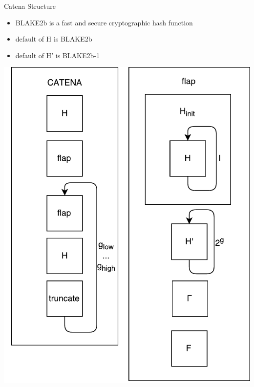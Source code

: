 \documentclass[11pt,aspectratio=169]{beamer}
\begin{document}
\begin{frame}{Catena Structure}  
  \begin{minipage}[H]{0.55\linewidth}
    \begin{itemize}
      \item BLAKE2b is a fast and secure cryptographic hash function
      \item default of H is BLAKE2b
      \item default of H' is BLAKE2b-1
    \end{itemize}
  \end{minipage}
  \hfill
  \begin{minipage}[H]{0.4\linewidth}
    \includegraphics[height=0.85\textheight]{./images/overview.pdf}
  \end{minipage}
\end{frame}
\end{document}
